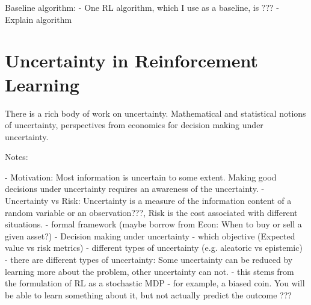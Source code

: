 Baseline algorithm: 
- One RL algorithm, which I use as a baseline, is ???
- Explain algorithm



\section{Uncertainty in Reinforcement Learning}
There is a rich body of work on uncertainty. Mathematical and statistical notions of uncertainty, perspectives from economics for decision making under uncertainty.

Notes:

- Motivation: Most information is uncertain to some extent. Making good decisions under uncertainty requires an awareness of the uncertainty.
- Uncertainty vs Risk: Uncertainty is a measure of the information content of a random variable or an observation???, Risk is the cost associated with different situations.
- formal framework (maybe borrow from Econ: When to buy or sell a given asset?)
- Decision making under uncertainty
    - which objective (Expected value vs risk metrics)
- different types of uncertainty (e.g. aleatoric vs epistemic)
    - there are different types of uncertainty: Some uncertainty can be reduced by learning more about the problem, other uncertainty can not.
    - this stems from the formulation of RL as a stochastic MDP
    - for example, a biased coin. You will be able to learn something about it, but not actually predict the outcome ???

